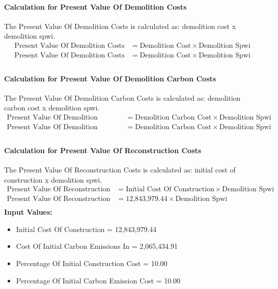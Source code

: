 \documentclass{article}
\begin{document}
 \paragraph{Calculation for Present Value Of Demolition Costs} 
The Present Value Of Demolition Costs is calculated as: demolition cost x demolition spwi.
\begin{align*}
 \text{Present Value Of Demolition Costs} &= \text{Demolition Cost} \times \text{Demolition Spwi} \\
 \text{Present Value Of Demolition Costs} &= \text{Demolition Cost} \times \text{Demolition Spwi} \\
\end{align*}
 \paragraph{Calculation for Present Value Of Demolition Carbon Costs} 
The Present Value Of Demolition Carbon Costs is calculated as: demolition carbon cost x demolition spwi.
\begin{align*}
 \text{Present Value Of Demolition Carbon Costs} &= \text{Demolition Carbon Cost} \times \text{Demolition Spwi} \\
 \text{Present Value Of Demolition Carbon Costs} &= \text{Demolition Carbon Cost} \times \text{Demolition Spwi} \\
\end{align*}
 \paragraph{Calculation for Present Value Of Reconstruction Costs} 
The Present Value Of Reconstruction Costs is calculated as: initial cost of construction x demolition spwi.
\begin{align*}
 \text{Present Value Of Reconstruction Costs} &= \text{Initial Cost Of Construction} \times \text{Demolition Spwi} \\
 \text{Present Value Of Reconstruction Costs} &= \text{12,843,979.44} \times \text{Demolition Spwi} \\
\end{align*}
\textbf{Input Values:}
\begin{itemize}
\item Initial Cost Of Construction = 12,843,979.44
\item Cost Of Initial Carbon Emissions In = 2,065,434.91
\item Percentage Of Initial Construction Cost = 10.00
\item Percentage Of Initial Carbon Emission Cost = 10.00
\end{itemize}
\end{document}
